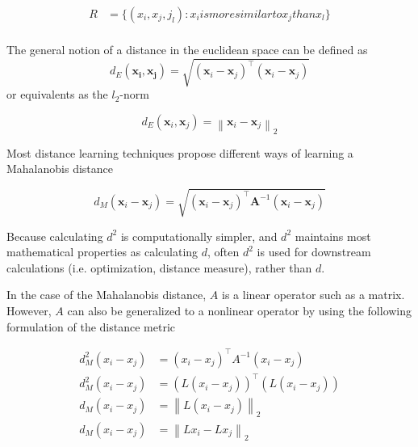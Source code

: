 \documentclass[a4paper,12pt,twoside,openright]{report}
\begin{document}
\begin{align}
R &= \{ (x_i, x_j, j_l) : x_i is more similar to x_j than x_l \} \\
\end{align}

The general notion of a distance in the euclidean space can be defined as 
\begin{equation}
d_{E}\left(\boldsymbol{x}_{\boldsymbol{i}}, \boldsymbol{x}_{\boldsymbol{j}}\right)=\sqrt{\left(\boldsymbol{x}_{i}-\boldsymbol{x}_{j}\right)^{\top}\left(\boldsymbol{x}_{i}-\boldsymbol{x}_{j}\right)}
\end{equation}
or equivalents as the $l_2$-norm

\begin{equation}
d_{E}\left(\boldsymbol{x}_{i}, \boldsymbol{x}_{j}\right)=\left\|\boldsymbol{x}_{i}-\boldsymbol{x}_{j}\right\|_{2}
\end{equation}

Most distance learning techniques propose different ways of learning a Mahalanobis distance \cite{mahalanobis36}

\begin{equation}
d_{M}\left(\boldsymbol{x}_{i}-\boldsymbol{x}_{j}\right)=\sqrt{\left(\boldsymbol{x}_{i}-\boldsymbol{x}_{j}\right)^{\top} \boldsymbol{A}^{-1}\left(\boldsymbol{x}_{i}-\boldsymbol{x}_{j}\right)}
\end{equation}

Because calculating $d^2$ is computationally simpler, and $d^2$ maintains most mathematical properties as calculating $d$, often $d^2$ is used for downstream calculations (i.e. optimization, distance measure), rather than $d$.

In the case of the Mahalanobis distance, $A$ is a linear operator such as a matrix.
However, $A$ can also be generalized to a nonlinear operator by using the following formulation of the distance metric

\begin{align}
d_{M}^{2}\left(x_{i}-x_{j}\right) &=\left(x_{i}-x_{j}\right)^{\top} A^{-1}\left(x_{i}-x_{j}\right) \\
d_{M}^{2}\left(x_{i}-x_{j}\right) &= (L\left(x_{i}-x_{j}\right))^{\top} (L\left(x_{i}-x_{j}\right)) \\
d_{M}\left(x_{i}-x_{j}\right) &=\left\|L\left(x_{i}-x_{j}\right)\right\|_{2} \\
d_{M}\left(x_{i}-x_{j}\right) &=\left\|Lx_{i}-Lx_{j}\right\|_{2}
\end{align}
\end{document}
